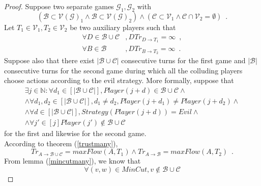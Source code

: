 \documentclass[11pt]{llncs}
\begin{document}
    \begin{proof}
       Suppose two separate games $\mathcal{G}_1, \mathcal{G}_2$ with
       \begin{equation}
          (\mathcal{B} \subset \mathcal{V(G)}_1 \wedge \mathcal{B} \subset \mathcal{V(G)}_2) \wedge
       (\mathcal{C} \subset \mathcal{V}_1 \wedge \mathcal{C} \cap \mathcal{V}_2 = \emptyset) \enspace.
       \end{equation}
       Let $T_1 \in \mathcal{V}_1, T_2 \in \mathcal{V}_2$ be two auxiliary players such that
       \begin{align}
          \forall D \in \mathcal{B} \cup \mathcal{C}&, DTr_{D \rightarrow T_1} = \infty \enspace, \\
          \forall B \in \mathcal{B}&, DTr_{B \rightarrow T_2} = \infty \enspace.
       \end{align}
       Suppose also that there exist $|\mathcal{B} \cup \mathcal{C}|$ consecutive turns for the first game and
       $|\mathcal{B}|$ consecutive turns for the second game during which all the colluding players choose actions according
       to the evil strategy. More formally, suppose that
       \begin{equation}
       \begin{gathered}
          \exists j \in \mathbb{N} : \forall d_1 \in [|\mathcal{B} \cup \mathcal{C}|], Player(j+d) \in \mathcal{B} \cup
          \mathcal{C} \wedge \\
          \wedge \forall d_1, d_2 \in [|\mathcal{B} \cup \mathcal{C}|], d_1 \neq d_2, Player(j + d_1) \neq Player(j + d_2)
          \wedge \\
          \wedge \forall d \in [|\mathcal{B} \cup \mathcal{C}|], Strategy(Player(j+d)) = Evil \wedge \\
          \wedge \forall j' \in [j] Player(j') \notin \mathcal{B} \cup \mathcal{C}
       \end{gathered}
       \end{equation}
       for the first and likewise for the second game. \\
       According to theorem (\ref{trustmany}),
       \begin{equation}
          Tr_{A \rightarrow \mathcal{B} \cup \mathcal{C}} = maxFlow\left(A, T_1\right) \wedge
          Tr_{A \rightarrow \mathcal{B}} = maxFlow\left(A, T_2\right) \enspace.
       \end{equation}
       From lemma (\ref{mincutmany}), we know that
       \begin{equation}
          \forall (v,w) \in MinCut, v \notin \mathcal{B} \cup \mathcal{C}

\end{equation}
\end{proof}
\end{document}
